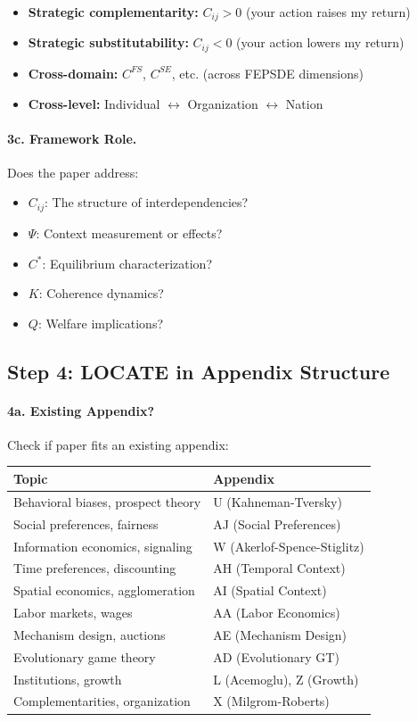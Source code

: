 \begin{itemize}
  \item \textbf{Strategic complementarity:} $C_{ij} > 0$ (your action raises my return)
  \item \textbf{Strategic substitutability:} $C_{ij} < 0$ (your action lowers my return)
  \item \textbf{Cross-domain:} $C^{FS}$, $C^{SE}$, etc. (across FEPSDE dimensions)
  \item \textbf{Cross-level:} Individual $\leftrightarrow$ Organization $\leftrightarrow$ Nation
\end{itemize}

\paragraph{3c. Framework Role.}
Does the paper address:
\begin{itemize}
  \item $C_{ij}$: The structure of interdependencies?
  \item $\Psi$: Context measurement or effects?
  \item $C^*$: Equilibrium characterization?
  \item $K$: Coherence dynamics?
  \item $Q$: Welfare implications?
\end{itemize}

\subsection{Step 4: LOCATE in Appendix Structure}

\paragraph{4a. Existing Appendix?}
Check if paper fits an existing appendix:

\begin{center}
\renewcommand{\arraystretch}{1.2}
\begin{tabular}{|l|l|}
\hline
\textbf{Topic} & \textbf{Appendix} \\
\hline
Behavioral biases, prospect theory & U (Kahneman-Tversky) \\
Social preferences, fairness & AJ (Social Preferences) \\
Information economics, signaling & W (Akerlof-Spence-Stiglitz) \\
Time preferences, discounting & AH (Temporal Context) \\
Spatial economics, agglomeration & AI (Spatial Context) \\
Labor markets, wages & AA (Labor Economics) \\
Mechanism design, auctions & AE (Mechanism Design) \\
Evolutionary game theory & AD (Evolutionary GT) \\
Institutions, growth & L (Acemoglu), Z (Growth) \\
Complementarities, organization & X (Milgrom-Roberts) \\
\hline
\end{tabular}
\end{center}

